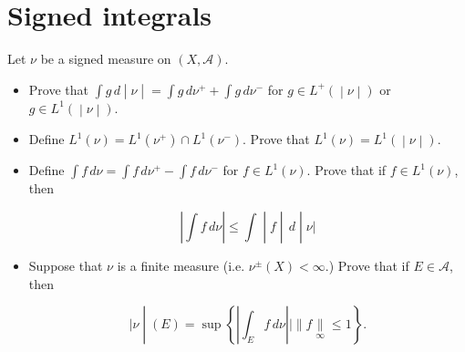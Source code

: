 \documentclass{qlnotes-export}
\begin{document}
\section{Signed integrals}\label{signed-integrals}

Let \(\nu\) be a signed measure on \((X,\mathcal{A})\).

\begin{itemize}
\item
  Prove that \(\left. \int g\, d \middle| \nu \middle| = \int g\, d\nu^{+} + \int g\, d\nu^{-} \right.\) for \(\left. g \in L^{+}( \middle| \nu \middle| ) \right.\) or \(\left. g \in L^{1}( \middle| \nu \middle| ) \right.\).
\item
  Define \(L^{1}(\nu) = L^{1}(\nu^{+}) \cap L^{1}(\nu^{-})\). Prove that \(\left. L^{1}(\nu) = L^{1}( \middle| \nu \middle| ) \right.\).
\item
  Define \(\int f\, d\nu = \int f\, d\nu^{+} - \int f\, d\nu^{-}\) for \(f \in L^{1}(\nu)\). Prove that if \(f \in L^{1}(\nu)\), then

  \[\left. \left| {\int f\, d\nu} \right| \leq \int \middle| f \middle| \, d \middle| \nu| \right.\]
\item
  Suppose that \(\nu\) is a finite measure (i.e. \(\nu^{\pm}(X) < \infty\).) Prove that if \(E \in \mathcal{A}\), then

  \[\left. |\nu \middle| (E) = \sup\left\{ {\left| {\int_{E}f\, d\nu} \right| \mid \parallel f\underset{\infty}{\parallel} \leq 1} \right\}. \right.\]
\end{itemize}
\end{document}
